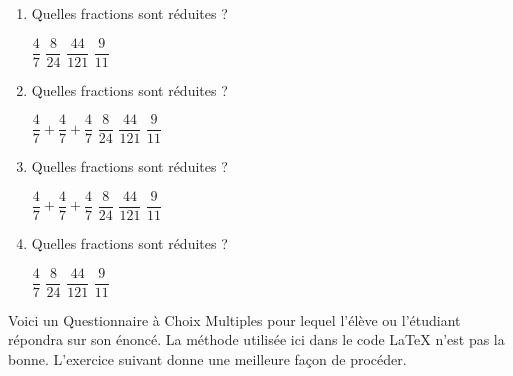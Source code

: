 \documentclass[a4,12pt]{article}
\begin{document}
\begin{enumerate}
	\item Quelles fractions sont réduites ?
	\begin{choices}
		\choice $\dfrac{4}{7}$
		\choice $\dfrac{8}{24}$
		\choice $\dfrac{44}{121}$
		\choice $\dfrac{9}{11}$
	\end{choices}

	\item Quelles fractions sont réduites ?
	\begin{choices}[4]
		\choice $\dfrac{4}{7}+\dfrac{4}{7}+\dfrac{4}{7}$
		\choice $\dfrac{8}{24}$
		\choice $\dfrac{44}{121}$
		\choice $\dfrac{9}{11}$
	\end{choices}

	\item Quelles fractions sont réduites ?
	\begin{inlineChoices}
		\choice $\dfrac{4}{7}+\dfrac{4}{7}+\dfrac{4}{7}$
		\choice $\dfrac{8}{24}$
		\choice $\dfrac{44}{121}$
		\choice $\dfrac{9}{11}$
	\end{inlineChoices}

	\item Quelles fractions sont réduites ?

	\begin{inlineChoices}
		\choice $\dfrac{4}{7}$
		\choice $\dfrac{8}{24}$
		\choice $\dfrac{44}{121}$
		\choice $\dfrac{9}{11}$
	\end{inlineChoices}
\end{enumerate}


\newpage

\exercise{}

Voici un Questionnaire à Choix Multiples pour lequel
l'élève ou l'étudiant répondra sur son énoncé.
La méthode utilisée ici dans le code \LaTeX{} n'est
pas la bonne. L'exercice suivant donne une meilleure
façon de procéder.
\end{document}
